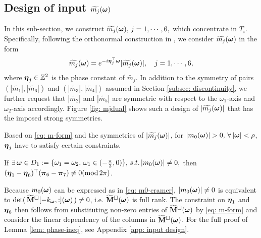 \subsection{Design of input $\widetilde{m_{j}}(\boldsymbol{\omega})$}\label{sec: phase-design}
In this sub-section, we construct $\widetilde{m_{j}}(\boldsymbol{\omega}),\, j = 1,\cdots,6,$ which concentrate in $T_i$.
Specifically, following the orthonormal construction in \cite{yin2014orthshear}, we consider $\widetilde{m_{j}}(\boldsymbol{\omega})$ in the form 
\begin{align}\label{eq: m-form}
\widetilde{m_{j}}(\boldsymbol{\omega}) = e^{-i\boldsymbol{\eta}_j^\top\boldsymbol{\omega}}|\widetilde{m_{j}}(\boldsymbol{\omega})|,\quad j = 1,\cdots,6,
\end{align}
where $\boldsymbol{\eta}_j\in\mathbb{Z}^2$ is the phase constant of $\widetilde{m_j}$. In addition to the symmetry of pairs $(|\widetilde{m_1}|, |\widetilde{m_6}|)$ and $(|\widetilde{m_3}|, |\widetilde{m_4}|)$ assumed in Section \ref{subsec: discontinuity}, we further request that $|\widetilde{m_2}|$ and $|\widetilde{m_5}|$ are symmetric with respect to the $\omega_1$-axis and $\omega_2$-axis accordingly.
Figure \ref{fig: mjdual} shows such a design of $|\widetilde{m_{j}}(\boldsymbol{\omega})|$ that has the imposed strong symmetries.
 
Based on \eqref{eq: m-form} and the symmetries of $|\widetilde{m_{j}}(\boldsymbol{\omega})|$, for $|m_0(\boldsymbol{\omega})| > 0,\, \forall\, |\boldsymbol{\omega}| < \rho$, $\boldsymbol{\eta}_j$ have to satisfy certain constraints.
 
\begin{lemma}\label{lem: phase-ineq}
If $\exists\,\boldsymbol{\omega}\in D_1:=\{\omega_1=\omega_2,\,\omega_1\in(-\frac{\pi}{2},0)\},\,s.t. \,|m_0(\boldsymbol{\omega})|\neq 0,$ then $(\boldsymbol{\eta}_1-\boldsymbol{\eta}_6)^\top (\boldsymbol{\pi}_6-\boldsymbol{\pi}_7)\neq 0(\text{mod}\,2\pi)$. 
\end{lemma} 

Because $m_0(\boldsymbol{\omega})$ can be expressed as in \eqref{eq: m0-cramer}, $|m_0(\boldsymbol{\omega})|\neq 0$ is equivalent to $\det(\,\widetilde{\mathbf{M}}^{\Box}[-k_{\boldsymbol{\omega}},:](\boldsymbol{\omega})\,)\neq 0$, i.e. $\widetilde{\mathbf{M}}^{\Box}(\boldsymbol{\omega})$ is full rank. The constraint on $\boldsymbol{\eta}_1$ and $\boldsymbol{\eta}_6$ then follows from substituting non-zero entries of $\widetilde{\mathbf{M}}^{\Box}(\boldsymbol{\omega})$ by \eqref{eq: m-form} and consider the linear dependency of the columns in $\widetilde{\mathbf{M}}^{\Box}(\boldsymbol{\omega})$. For the full proof of Lemma \ref{lem: phase-ineq}, see Appendix \ref{app: input design}.

